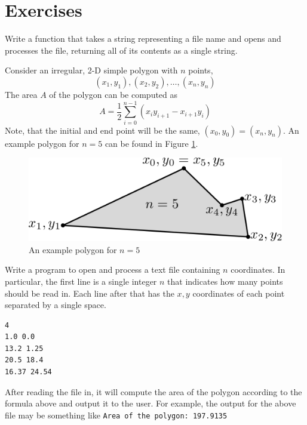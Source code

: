 

\section{Exercises}

\begin{exer}
Write a function that takes a string representing a file name and
opens and processes the file, returning all of its contents as a single
string.
\end{exer}

\begin{exer}
Consider an irregular, 2-D simple polygon with $n$ points, 
  $$(x_1, y_1), (x_2, y_2), \ldots, (x_n, y_n)$$
The area $A$ of the polygon can be computed as
$$A = \frac{1}{2} \sum_{i=0}^{n-1} (x_iy_{i+1} - x_{i+1}y_i)$$
Note, that the initial and end point will be the same, $(x_0, y_0) =
(x_n,y_n)$.  An example polygon for $n = 5$ can be found in 
Figure \ref{fig:polygonEx}.

\begin{figure}[h]
\centering
\includegraphics[scale=.5]{images/polygonEx}
\caption{An example polygon for $n=5$}
\label{fig:polygonEx}
\end{figure}

Write a program to open and process a text file containing
$n$ coordinates.  In particular, the first line is a single integer 
$n$ that indicates how many points should be read in.  Each 
line after that has the $x, y$ coordinates of each point separated 
by a single space.

\begin{verbatim}
4
1.0 0.0
13.2 1.25
20.5 18.4
16.37 24.54
\end{verbatim}

After reading the file in, it will compute the area of the polygon 
according to the formula above and output it to the user.  For example, 
the output for the above file may be something like \texttt{Area of the polygon: 197.9135}
\end{exer}


